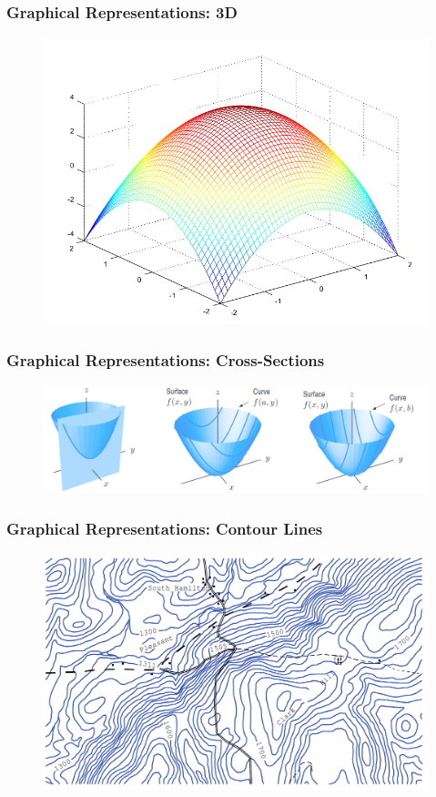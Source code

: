 \documentclass[xcolor=dvipsnames]{beamer}
\begin{document}
\begin{frame}
  \frametitle{Graphical Representations: 3D}
  \begin{figure}[h]
    \includegraphics[scale=0.5]{./diagrams/octave-01.png}
  \end{figure}
\end{frame}

\begin{frame}
  \frametitle{Graphical Representations: Cross-Sections}
  \begin{figure}[h]
    \includegraphics[scale=0.35]{./diagrams/hallett-01.png}
  \end{figure}
\end{frame}

\begin{frame}
  \frametitle{Graphical Representations: Contour Lines}
  \begin{figure}[h]
    \includegraphics[scale=0.4]{./diagrams/hallett-02.png}
  \end{figure}
\end{frame}
\end{document}
